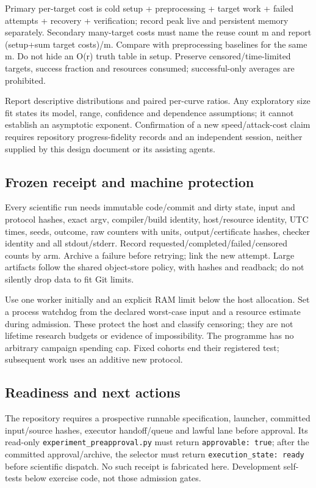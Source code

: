 \documentclass[
  10pt,
]{article}
\begin{document}
Primary per-target cost is cold setup + preprocessing + target work +
failed attempts + recovery + verification; record peak live and
persistent memory separately. Secondary many-target costs must name the
reuse count m and report (setup+sum target costs)/m. Compare with
preprocessing baselines for the same m. Do not hide an O(r) truth table
in setup. Preserve censored/time-limited targets, success fraction and
resources consumed; successful-only averages are prohibited.

Report descriptive distributions and paired per-curve ratios. Any
exploratory size fit states its model, range, confidence and dependence
assumptions; it cannot establish an asymptotic exponent. Confirmation of
a new speed/attack-cost claim requires repository progress-fidelity
records and an independent session, neither supplied by this design
document or its assisting agents.

\subsection{Frozen receipt and machine
protection}\label{frozen-receipt-and-machine-protection}

Every scientific run needs immutable code/commit and dirty state, input
and protocol hashes, exact argv, compiler/build identity, host/resource
identity, UTC times, seeds, outcome, raw counters with units,
output/certificate hashes, checker identity and all stdout/stderr.
Record requested/completed/failed/censored counts by arm. Archive a
failure before retrying; link the new attempt. Large artifacts follow
the shared object-store policy, with hashes and readback; do not
silently drop data to fit Git limits.

Use one worker initially and an explicit RAM limit below the host
allocation. Set a process watchdog from the declared worst-case input
and a resource estimate during admission. These protect the host and
classify censoring; they are not lifetime research budgets or evidence
of impossibility. The programme has no arbitrary campaign spending cap.
Fixed cohorts end their registered test; subsequent work uses an
additive new protocol.

\subsection{Readiness and next
actions}\label{readiness-and-next-actions}

The repository requires a prospective runnable specification, launcher,
committed input/source hashes, executor handoff/queue and lawful lane
before approval. Its read-only \texttt{experiment\_preapproval.py} must
return \texttt{approvable:\ true}; after the committed approval/archive,
the selector must return \texttt{execution\_state:\ ready} before
scientific dispatch. No such receipt is fabricated here. Development
self-tests below exercise code, not those admission gates.
\end{document}
